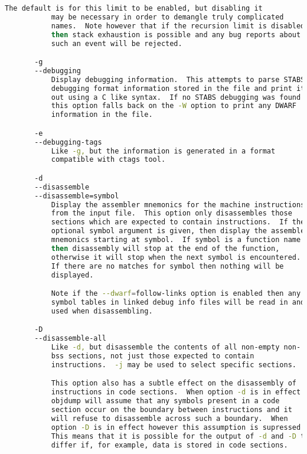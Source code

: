 {{\begin{lstlisting}[language=bash]
           The default is for this limit to be enabled, but disabling it
           may be necessary in order to demangle truly complicated
           names.  Note however that if the recursion limit is disabled
           then stack exhaustion is possible and any bug reports about
           such an event will be rejected.

       -g
       --debugging
           Display debugging information.  This attempts to parse STABS
           debugging format information stored in the file and print it
           out using a C like syntax.  If no STABS debugging was found
           this option falls back on the -W option to print any DWARF
           information in the file.

       -e
       --debugging-tags
           Like -g, but the information is generated in a format
           compatible with ctags tool.

       -d
       --disassemble
       --disassemble=symbol
           Display the assembler mnemonics for the machine instructions
           from the input file.  This option only disassembles those
           sections which are expected to contain instructions.  If the
           optional symbol argument is given, then display the assembler
           mnemonics starting at symbol.  If symbol is a function name
           then disassembly will stop at the end of the function,
           otherwise it will stop when the next symbol is encountered.
           If there are no matches for symbol then nothing will be
           displayed.

           Note if the --dwarf=follow-links option is enabled then any
           symbol tables in linked debug info files will be read in and
           used when disassembling.

       -D
       --disassemble-all
           Like -d, but disassemble the contents of all non-empty non-
           bss sections, not just those expected to contain
           instructions.  -j may be used to select specific sections.

           This option also has a subtle effect on the disassembly of
           instructions in code sections.  When option -d is in effect
           objdump will assume that any symbols present in a code
           section occur on the boundary between instructions and it
           will refuse to disassemble across such a boundary.  When
           option -D is in effect however this assumption is supressed.
           This means that it is possible for the output of -d and -D to
           differ if, for example, data is stored in code sections.


\end{lstlisting}}}
